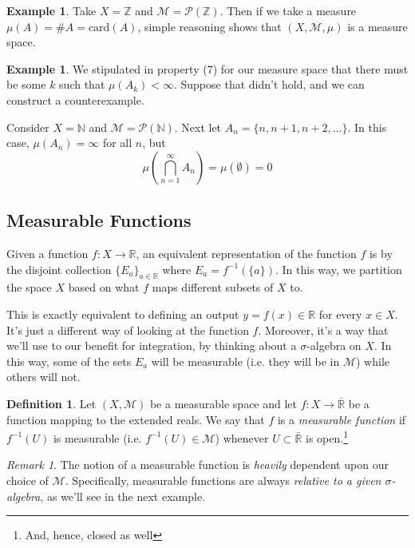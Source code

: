 \documentclass[12pt]{article}
\theoremstyle{plain}
\theoremstyle{definition}
\newtheorem{defn}[thm]{Definition}
\newtheorem{ex}[thm]{Example}
\theoremstyle{remark}
\newtheorem*{rmk}{Remark}
\begin{document}
\begin{ex}
Take $X=\mathbb{Z}$ and $\mathscr{M}=\mathscr{P}(\mathbb{Z})$. Then if we take a measure $\mu(A) = \#A = \text{card}\left( A \right)$, simple reasoning shows that $(X,\mathscr{M},\mu)$ is a measure space.
\end{ex}

\begin{ex}
    We stipulated in property (7) for our measure space that there must be some $k$ such that $\mu(A_k)<\infty$. Suppose that didn't hold, and we can construct a counterexample. 
    
    Consider $X = \mathbb{N}$ and $\mathscr{M} =\mathscr{P}(\mathbb{N})$. Next let $A_n = \{n, n+1, n+2, \ldots\}$. In this case, $\mu(A_n) = \infty$ for all $n$, but
    \[ 
        \mu\left(\bigcap^\infty_{n=1} A_n\right) = 
        \mu(\emptyset) = 0
    \]
\end{ex}

\subsection{Measurable Functions}


Given a function $f:X\rightarrow\mathbb{R}$, an equivalent representation of the function $f$ is by the disjoint collection $\{E_a\}_{a\in\mathbb{R}}$ where $E_a = f^{-1}\left(\{a\}\right)$. In this way, we partition the space $X$ based on what $f$ maps different subsets of $X$ to.  

This is exactly equivalent to defining an output $y=f(x)\in\mathbb{R}$ for every $x\in X$.  It's just a different way of looking at the function $f$. Moreover, it's a way that we'll use to our benefit for integration, by thinking about a $\sigma$-algebra on $X$. In this way, some of the sets $E_a$ will be measurable (i.e. they will be in $\mathscr{M}$) while others will not.

\begin{defn}
Let $(X,\mathscr{M})$ be a measurable space and let $f:X\rightarrow\bar{\mathbb{R}}$ be a function mapping to the extended reals. We say that $f$ is a \emph{measurable function} if $f^{-1}(U)$ is measurable (i.e.  $f^{-1}(U)\in\mathscr{M}$) whenever $U\subset\bar{\mathbb{R}}$ is open.\footnote{And, hence, closed as well} 
\end{defn}

\begin{rmk}
The notion of a measurable function is \emph{heavily} dependent upon our choice of $\mathscr{M}$.  Specifically, measurable functions are always \emph{relative to a given $\sigma$-algebra}, as we'll see in the next example.
\end{rmk}
\end{document}
